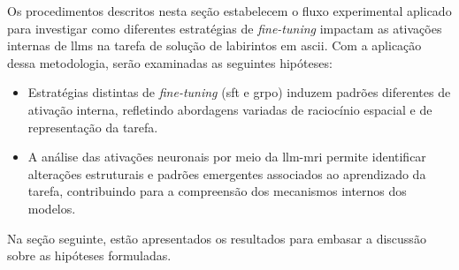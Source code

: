 Os procedimentos descritos nesta seção estabelecem o fluxo experimental aplicado para investigar como diferentes estratégias de \textit{fine-tuning} impactam as ativações internas de \gls{llms} na tarefa de solução de labirintos em \gls{ascii}. Com a aplicação dessa metodologia, serão examinadas as seguintes hipóteses:

\begin{itemize}
    \item[H1:] Estratégias distintas de \textit{fine-tuning} (\gls{sft} e \gls{grpo}) induzem padrões diferentes de ativação interna, refletindo abordagens variadas de raciocínio espacial e de representação da tarefa.
    \item[H2:] A análise das ativações neuronais por meio da \gls{llm-mri} permite identificar alterações estruturais e padrões emergentes associados ao aprendizado da tarefa, contribuindo para a compreensão dos mecanismos internos dos modelos.
\end{itemize}

Na seção seguinte, estão apresentados os resultados para embasar a discussão sobre as hipóteses formuladas.
